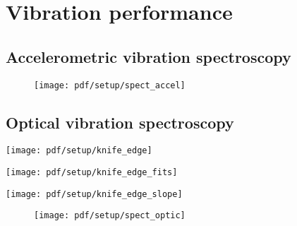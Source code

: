 \chapter{Vibration performance}\label{ch:setup:vibrations}

\section{Accelerometric vibration spectroscopy}\label{sec:setup:vibrations:accel}

\begin{figure}
    \centering
    \texttt{[image: pdf/setup/spect\_accel]}
    \caption{}
    \label{fig:}
\end{figure}

\section{Optical vibration spectroscopy}\label{sec:setup:vibrations:optic}

\begin{marginfigure}
    \centering
    \texttt{[image: pdf/setup/knife\_edge]}
    \caption{}
    \label{fig:}
\end{marginfigure}

\begin{marginfigure}
    \centering
    \texttt{[image: pdf/setup/knife\_edge\_fits]}
    \caption{}
    \label{fig:}
\end{marginfigure}

\begin{marginfigure}
    \centering
    \texttt{[image: pdf/setup/knife\_edge\_slope]}
    \caption{}
    \label{fig:}
\end{marginfigure}

\begin{figure}
    \centering
    \texttt{[image: pdf/setup/spect\_optic]}
    \caption{}
    \label{fig:}
\end{figure}
